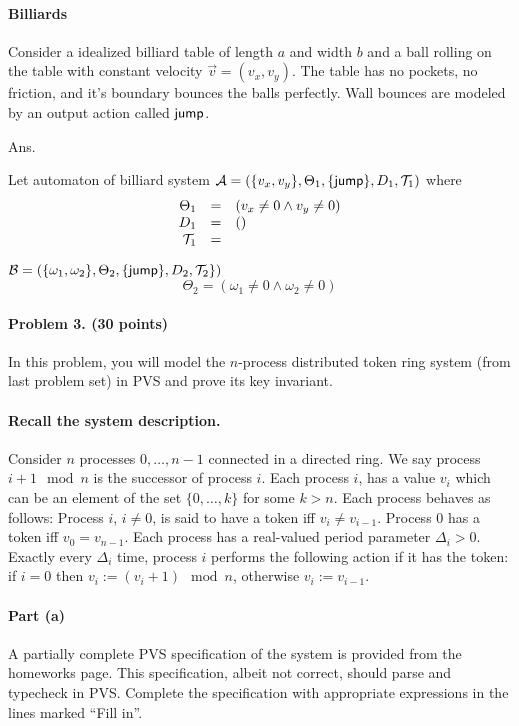 \documentclass[11pt]{article}
\begin{document}
 \paragraph{Billiards}
 Consider a idealized billiard table of length $a$ and width $b$ and a ball rolling on the table with constant velocity $\vec{v} = (v_x, v_y)$. The table has no pockets, no friction, and it's boundary bounces the balls perfectly. Wall bounces are modeled by an output action called ${\operatorname{\mathsf{jump}}}$. 
 
 Ans.
 
Let automaton of billiard system ${\cal A} = (\{v_x, v_y\}, \Theta_1, \{{\operatorname{\mathsf{jump}}}\}, D_1, {\cal T}_1)$ where
\[
\begin{array}{rcl}
	\Theta_1 & = & (v_x \neq 0 \land v_y \neq 0) \\
	     D_1 & = & ()                            \\
	    {\cal T}_1 & = & 
\end{array}
\]

${\cal B} = (\{\omega_1, \omega_2\}, \Theta_2, \{{\operatorname{\mathsf{jump}}}\}, D_2, {\cal T}_2 \})$
\[
\Theta_2 = (\omega_1 \neq 0 \land \omega_2 \neq 0)
\]
 
 \paragraph{Problem 3. (30 points)} In this problem, you will model the $n$-process distributed token ring system (from last problem set) in PVS  and prove its key invariant. 

\paragraph{Recall the system description.} Consider $n$ processes $0, \ldots, n-1$ connected in a directed ring. 
We say process $i+1 \mod n$ is the successor of process $i$. Each process $i$, has a value $v_i$ which can be an element of the set $\{0, \ldots, k\}$ for some $k > n$. Each process behaves as follows: Process $i$, $i \neq 0$, is said to have a token iff $v_i \neq v_{i- 1}$. Process $0$ has a token iff $v_0 = v_{n-1}$. Each process has a real-valued period parameter  $\Delta_i > 0$. 
Exactly every $\Delta_i$ time, process $i$ performs the following action if it has the token: 
if $i = 0$ then $v_i := (v_i + 1) \mod n$, otherwise $v_i := v_{i- 1}$. 

\paragraph{Part (a)} 
A partially complete PVS specification of the system is provided from the homeworks page. This specification, albeit not correct, should parse and typecheck in PVS. Complete the specification with appropriate expressions in the lines marked ``Fill in''.
\end{document}
